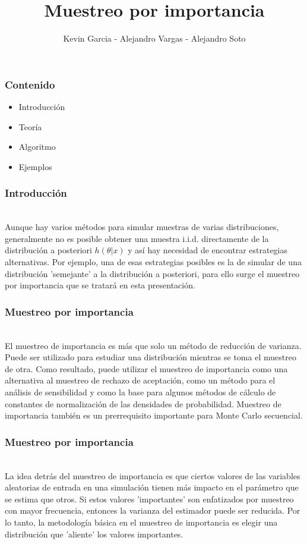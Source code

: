 \documentclass[12pt]{beamer}
\author{Kevin Garcia - Alejandro Vargas - Alejandro Soto}
\title{Muestreo por importancia}
\begin{document}
\begin{frame}
\titlepage
\end{frame}

\begin{frame}
\frametitle{Contenido}
\begin{itemize}
\item Introducción
\item Teoría
\item Algoritmo
\item Ejemplos
\end{itemize}
\end{frame}

\begin{frame}
\frametitle{Introducción}
~\\Aunque hay varios métodos para simular muestras de varias distribuciones, generalmente no es posible obtener una muestra i.i.d. directamente de la distribución a posteriori $h(\theta|x)$ y así hay necesidad de encontrar estrategias alternativas. Por ejemplo, una de esas estrategias posibles es la de simular de una distribución 'semejante' a la distribución a posteriori, para ello surge el muestreo por importancia que se tratará en esta presentación.
\end{frame}

\begin{frame}
\frametitle{Muestreo por importancia}
~\\El muestreo de importancia es más que solo un método de reducción de varianza. Puede
ser utilizado para estudiar una distribución mientras se toma el muestreo de otra. Como resultado,
puede utilizar el muestreo de importancia como una alternativa al muestreo de rechazo de aceptación, como un método para el análisis de sensibilidad y como la base para algunos métodos de cálculo de constantes de normalización de las densidades de probabilidad. Muestreo de importancia
también es un prerrequisito importante para Monte Carlo secuencial.
\end{frame}

\begin{frame}
\frametitle{Muestreo por importancia}
~\\La idea detrás del muestreo de importancia es que ciertos valores de las variables aleatorias de entrada en una simulación tienen más impacto en el parámetro que se estima que otros. Si estos valores 'importantes' son enfatizados por muestreo con mayor frecuencia, entonces la varianza del estimador puede ser reducida. Por lo tanto, la metodología básica en el muestreo de importancia es elegir una distribución que 'aliente' los valores importantes.
\end{frame}
\end{document}
